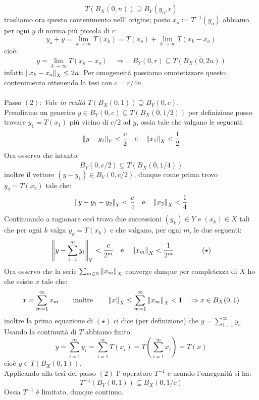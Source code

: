 $$
\overline{T(B_X (0,n))}\supseteq B_Y(y_o,r) 
$$
trasliamo ora questo contenimento nell' origine; posto $x_o:=T^{-1}(y_o)$ abbiamo, per ogni $y$ di norma più piccola di $r$:
$$
y_o+y=\lim_{k\rightarrow \infty} T(x_k)=T(x_o)+ \lim_{k\rightarrow \infty} T(x_k-x_o)
$$
cioè:
$$
y=\lim_{k\rightarrow \infty} T(x_k-x_o)\quad \Rightarrow\quad B_Y(0,r)\subseteq \overline{T(B_X(0,2n))}
$$
infatti $\left \| x_k-x_o \right\|_X\leq 2n$. Per omogeneità possiamo omotetizzare questo contenimento ottenendo la tesi con $c=r/4n$.\\
\\
Passo $(2)$: {\it Vale in realtà} $T(B_X(0,1))\supseteq B_Y(0,c)$.\\
Prendiamo un generico $y\in B_Y(0,c)\subseteq \overline{T(B_X(0,1/2))}$ per definizione posso trovare $y_1=T(x_1)$ più vicino di $c/2$ ad $y$, ossia tale che valgano le seguenti:
$$
\left \| y-y_1 \right\|_Y<\frac{c}{2}\quad \mbox{e}\quad \left \| x_1 \right\|_X<\frac{1}{2}
$$
Ora osservo che intanto:
$$
B_Y(0,c/2)\subseteq \overline{T(B_X(0,1/4))}
$$
inoltre il vettore $(y-y_1)\in B_Y(0,c/2)$, dunque come prima trovo $y_2=T(x_2)$ tale che:
$$
\left \| y-y_1-y_2 \right\|_Y<\frac{c}{4}\quad \mbox{e}\quad \left \| x_2 \right\|_X<\frac{1}{4}
$$
Continuando a ragionare così trovo due successioni $(y_k)\in Y$ e $(x_k)\in X$ tali che per ogni $k$ valga $y_k=T(x_k)$ e che valgano, per ogni $m$, le due seguenti:
$$
\left \| y-\sum_{i=1}^m y_{i} \right\|_Y<\frac{c}{2^m}\quad \mbox{e}\quad \left \| x_m \right\|_X<\frac{1}{2^m}\qquad\qquad (\star)
$$
Ora osservo che la serie $\sum_{m\in\mathbb{N}}\left \| x_m \right\|_X$ converge dunque per completezza di $X$ ho che esiste $x$ tale che:
$$
x=\sum_{m=1}^{\infty} x_m\qquad \mbox{inoltre} \qquad \left \| x \right\|_X\leq\sum_{m=1}^{\infty} \left \| x_m \right\|_X<1\quad \Rightarrow x\in B_X(0,1)
$$
inoltre la prima equazione di $(\star)$ ci dice (per definizione) che $y=\sum_{i=1}^{\infty}y_i$. Usando la continuità di $T$ abbiamo finito:
$$
y=\sum_{i=1}^{\infty}y_i=\sum_{i=1}^{\infty}T(x_i)=T\left(\sum_{i=1}^{\infty}x_i\right)=T(x)
$$
cioè $y\in T(B_X(0,1))$.\\
Applicando alla tesi del passo $(2)$ l' operatore $T^{-1}$ e usando l'omegenità si ha:
$$
T^{-1}(B_Y(0,1))\subseteq B_X(0,1/c)
$$
Ossia $T^{-1}$ è limitato, dunque continuo.
